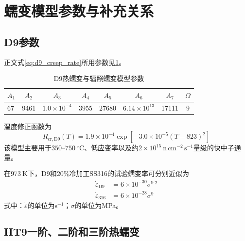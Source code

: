 \section{蠕变模型参数与补充关系}
\label{app:cladding_creep_parameters}

\subsection{D9参数}

正文式\eqref{eq:d9_creep_rate}所用参数见\tablename\ref{tab:appendix_d9_creep_parameters}\cite{hofmanMetallicFuelsHandbook2019}。
\begin{table}[htbp]
	\centering
	\caption{D9热蠕变与辐照蠕变模型参数}
	\label{tab:appendix_d9_creep_parameters}
	\begin{tabular*}{\textwidth}{
			@{\extracolsep{\fill}}
			lccccccc
			@{}
		}
		\toprule
		$A_1$ & $A_2$ & $A_3$ & $A_4$ & $A_5$ & $A_6$ & $A_7$ & $\Omega$ \\
		\midrule
		67 & 9461 & $1.0\times10^{-4}$ & 3955 & 27680 & $6.14\times10^{13}$ & 17111 & 9 \\
		\bottomrule
	\end{tabular*}
\end{table}
温度修正函数为
\begin{equation}
	R_{\mathrm{cr,D9}}(T)
	=1.9\times10^{-4}
	\exp[-3.0\times10^{-5}(T-823)^2]
	\label{eq:appendix_d9_creep_temperature_factor}
\end{equation}
该模型主要用于$350$--$750\ ^\circ\mathrm C$、低应变率以及约$2\times10^{15}\ \mathrm{n\,cm^{-2}\,s^{-1}}$量级的快中子通量。

在$973\ \mathrm{K}$下，D9和20\%冷加工SS316的试验蠕变率可分别近似为\cite{lathaThermalCreepProperties2008}
\begin{equation}
	\label{eq:appendix_d9_ss316_973k_creep}
	\begin{aligned}
		\dot\varepsilon_{\mathrm{D9}}
		&=6\times10^{-30}\sigma^{9.2}\\
		\dot\varepsilon_{316}
		&=6\times10^{-28}\sigma^9
	\end{aligned}
\end{equation}
式中：$\dot\varepsilon$的单位为$\mathrm{s^{-1}}$；$\sigma$的单位为MPa。

\subsection{HT9一阶、二阶和三阶热蠕变}


